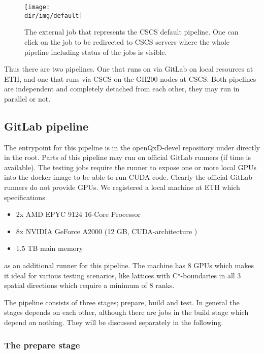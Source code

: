 \begin{figure}
    \centering
    \texttt{[image: \\dir/img/default]}
    \caption{The external job that represents the CSCS default pipeline. One can click on the job to be redirected to CSCS servers where the whole pipeline including status of the jobs is visible.}
    \label{fig:cicd:external}
\end{figure}

Thus there are two pipelines. One that runs on via GitLab on local resources at ETH, and one that runs via CSCS on the GH200 nodes at CSCS. Both pipelines are independent and completely detached from each other, they may run in parallel or not.

\subsection{GitLab pipeline}
\label{sec:cicd:pipeline:gitlab}

The entrypoint for this pipeline is in the openQxD-devel repository\cite{gitlab:openqxd-devel} under  directly in the root. Parts of this pipeline may run on official GitLab runners (if time is available). The testing jobs require the runner to expose one or more local GPUs into the docker image to be able to run CUDA code. Clearly the official GitLab runners do not provide GPUs. We registered a local machine at ETH which specifications
\begin{itemize}
    \item 2x AMD EPYC 9124 16-Core Processor
    \item 8x NVIDIA GeForce A2000 (12 GB, CUDA-architecture )
    \item 1.5 TB main memory
\end{itemize}
as an additional runner for this pipeline. The machine has 8 GPUs which makes it ideal for various testing scenarios, like lattices with C$^\star$-boundaries in all $3$ spatial directions which require a minimum of 8 ranks.

The pipeline consists of three stages; prepare, build and test. In general the stages depends on each other, although there are jobs in the build stage which depend on nothing. They will be discussed separately in the following.

\subsubsection{The prepare stage}

